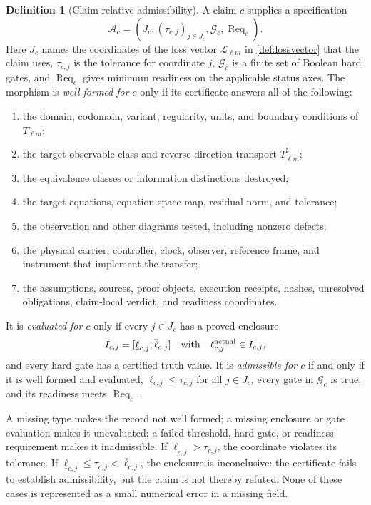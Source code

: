 \documentclass[11pt,a4paper]{article}
\theoremstyle{definition}
\newtheorem{definition}{Definition}[section]
\theoremstyle{plain}
\theoremstyle{remark}
\begin{document}
\begin{definition}[Claim-relative admissibility]\label{def:admissible}
A claim \(c\) supplies a specification
\[
\mathcal A_c=(J_c,(\tau_{c,j})_{j\in J_c},
\mathcal G_c,\operatorname{Req}_c).
\]
Here \(J_c\) names the coordinates of the loss vector
\(\mathcal L_{\ell m}\) in \cref{def:lossvector} that the claim uses,
\(\tau_{c,j}\) is the tolerance for coordinate \(j\),
\(\mathcal G_c\) is a finite set of Boolean hard gates, and
\(\operatorname{Req}_c\) gives minimum readiness on the applicable status
axes.  The morphism is \emph{well formed for \(c\)} only if its certificate
answers all of the following:
\begin{enumerate}
\item the domain, codomain, variant, regularity, units, and boundary conditions
of \(T_{\ell m}\);
\item the target observable class and reverse-direction transport
\(T_{\ell m}^{\sharp}\);
\item the equivalence classes or information distinctions destroyed;
\item the target equations, equation-space map, residual norm, and tolerance;
\item the observation and other diagrams tested, including nonzero defects;
\item the physical carrier, controller, clock, observer, reference frame, and
instrument that implement the transfer;
\item the assumptions, sources, proof objects, execution receipts, hashes,
unresolved obligations, claim-local verdict, and readiness coordinates.
\end{enumerate}
It is \emph{evaluated for \(c\)} only if every \(j\in J_c\) has a proved
enclosure
\[
I_{c,j}=[\underline\ell_{c,j},\overline\ell_{c,j}]
\quad\text{with}\quad
\ell_{c,j}^{\rm actual}\in I_{c,j},
\]
and every hard gate has a certified truth value.  It is
\emph{admissible for \(c\)} if and only if it is well formed and evaluated,
\(\overline\ell_{c,j}\le\tau_{c,j}\) for all \(j\in J_c\), every gate in
\(\mathcal G_c\) is true, and its readiness meets
\(\operatorname{Req}_c\).

A missing type makes the record not well formed; a missing enclosure or gate
evaluation makes it unevaluated; a failed threshold, hard gate, or readiness
requirement makes it inadmissible.  If
\(\underline\ell_{c,j}>\tau_{c,j}\), the coordinate violates its tolerance.
If
\(\underline\ell_{c,j}\le\tau_{c,j}<\overline\ell_{c,j}\), the enclosure is
inconclusive: the certificate fails to establish admissibility, but the claim
is not thereby refuted.  None of these cases is represented as a small
numerical error in a missing field.
\end{definition}
\end{document}
